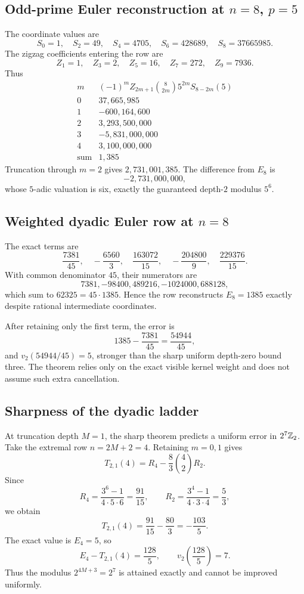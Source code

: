 \documentclass[11pt]{article}
\theoremstyle{definition}\newtheorem{definition}[theorem]{Definition}\newtheorem{example}[theorem]{Example}\newtheorem{construction}[theorem]{Construction}\newtheorem{algorithm}[theorem]{Algorithm}\newtheorem{conjecture}[theorem]{Conjecture}\newtheorem{problem}[theorem]{Problem}
\theoremstyle{remark}\newtheorem{remark}[theorem]{Remark}\newtheorem{boundary}[theorem]{Boundary}\newtheorem{certificate}[theorem]{Computational Certificate}\newtheorem{classical}[theorem]{Classical Input}\newtheorem{principle}[theorem]{Structural Principle}
\begin{document}
\subsection{Odd-prime Euler reconstruction at \texorpdfstring{$n=8$, $p=5$}{n=8, p=5}}
The coordinate values are
\[
 S_0=1,
 \quad S_2=49,
 \quad S_4=4705,
 \quad S_6=428689,
 \quad S_8=37665985.
\]
The zigzag coefficients entering the row are
\[
 Z_1=1,
 \quad Z_3=2,
 \quad Z_5=16,
 \quad Z_7=272,
 \quad Z_9=7936.
\]
Thus
\[
\begin{array}{c|r}
 m&(-1)^mZ_{2m+1}\binom8{2m}5^{2m}S_{8-2m}(5)\\
\hline
0&37{,}665{,}985\\
1&-600{,}164{,}600\\
2&3{,}293{,}500{,}000\\
3&-5{,}831{,}000{,}000\\
4&3{,}100{,}000{,}000\\
\hline
\text{sum}&1{,}385
\end{array}
\]
Truncation through $m=2$ gives $2{,}731{,}001{,}385$.  The difference from $E_8$ is
\[
 -2{,}731{,}000{,}000,
\]
whose $5$-adic valuation is six, exactly the guaranteed depth-$2$ modulus $5^6$.

\subsection{Weighted dyadic Euler row at \texorpdfstring{$n=8$}{n=8}}
The exact terms are
\[
 \frac{7381}{45},
 \quad-\frac{6560}{3},
 \quad\frac{163072}{15},
 \quad-\frac{204800}{9},
 \quad\frac{229376}{15}.
\]
With common denominator $45$, their numerators are
\[
 7381,-98400,489216,-1024000,688128,
\]
which sum to $62325=45\cdot1385$.  Hence the row reconstructs $E_8=1385$ exactly despite rational intermediate coordinates.

After retaining only the first term, the error is
\[
 1385-\frac{7381}{45}=\frac{54944}{45},
\]
and $v_2(54944/45)=5$, stronger than the sharp uniform depth-zero bound three.  The theorem relies only on the exact visible kernel weight and does not assume such extra cancellation.


\subsection{Sharpness of the dyadic ladder}
At truncation depth $M=1$, the sharp theorem predicts a uniform error in $2^7\mathbb Z_2$.  Take the extremal row $n=2M+2=4$.  Retaining $m=0,1$ gives
\[
 T_{2,1}(4)=R_4-\frac83\binom42R_2.
\]
Since
\[
 R_4=\frac{3^6-1}{4\cdot5\cdot6}=\frac{91}{15},
 \qquad
 R_2=\frac{3^4-1}{4\cdot3\cdot4}=\frac53,
\]
we obtain
\[
 T_{2,1}(4)=\frac{91}{15}-\frac{80}{3}=-\frac{103}{5}.
\]
The exact value is $E_4=5$, so
\[
 E_4-T_{2,1}(4)=\frac{128}{5},
 \qquad
 v_2\!\left(\frac{128}{5}\right)=7.
\]
Thus the modulus $2^{4M+3}=2^7$ is attained exactly and cannot be improved uniformly.
\end{document}
